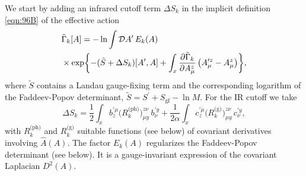 \documentclass[twocolumn,aps,prd,amsmath,amssymb,preprintnumbers,longbibliography]{revtex4-1}
\numberwithin{equation}{section}
\begin{document}
\begin{appendices}
We start by adding an infrared cutoff term $\Delta S_k$ in the implicit definition \eqref{eqn:96B} of the effective action
\begin{align}\label{eqn:FE1}
	&\tilde\Gamma_k[A]
	= -\ln \int \mathcal{D} A^\prime \, E_k(A)\\
	&\times \exp\biggl\{-(\tilde{S} + \Delta S_k)[A^\prime,A] + \int_x \frac{\partial \tilde\Gamma_k}{\partial A_\mu^z} \, \bigl(A_\mu^{\prime z} - A_\mu^z\bigr)\biggr\},\notag
\end{align}
where $\tilde{S}$ contains a Landau gauge-fixing term and the corresponding logarithm of the Faddeev-Popov determinant, $\tilde{S} = S^\prime + S_\text{gf} - \ln M$. For the IR cutoff we take
\begin{equation}\label{eqn:FE2}
	\Delta S_k
	= \frac{1}{2} \int_x b_z^{\prime \mu} \bigl(R_k^\text{(ph)}\bigr)_{\mu y}^{z \nu} \, b_\nu^{\prime y} + \frac{1}{2 \alpha} \int_x c_z^{\prime \mu} \bigl(R_k^\text{(g)}\bigr)_{\mu y}^{z \nu} \, c_\nu^{\prime y},
\end{equation}
with $R_k^\text{(ph)}$ and $R_k^\text{(g)}$ suitable functions (see below) of covariant derivatives involving $\hat{A}(A)$. The factor $E_k(A)$ regularizes the Faddeev-Popov determinant (see below). It is a gauge-invariant expression of the covariant Laplacian $D^2(A)$.


\end{appendices}
\end{document}
